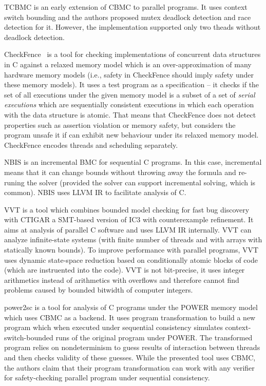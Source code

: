 TCBMC  is an early extension of CBMC to parallel programs.
It uses context switch bounding and the authors proposed mutex deadlock detection and race detection for it.
However, the implementation supported only two theads without deadlock detection.

CheckFence~ is a tool for checking implementations of concurrent data structures in C against a relaxed memory model which is an over-approximation of many hardware memory models (i.e., safety in CheckFence should imply safety under these memory models).
It uses a test program as a specification -- it checks if the set of all executions under the given memory model is a subset of a set of \emph{serial executions} which are sequentially consistent executions in which each operation with the data structure is atomic.
That means that CheckFence does not detect properties such as assertion violation or memory safety, but considers the program unsafe it if can exhibit new behaviour under its relaxed memory model.
CheckFence encodes threads and scheduling separately.

NBIS  is an incremental BMC for sequential C programs.
In this case, incremental means that it can change bounds without throwing away the formula and re-runing the solver (provided the solver can support incremental solving, which is common).
NBIS uses LLVM IR to facilitate analysis of C.

VVT  is a tool which combines bounded model checking for fast bug discovery with CTIGAR a SMT-based version of IC3 with counterexample refinement.
It aims at analysis of parallel C software and uses LLVM IR internally.
VVT can analyze infinite-state systems (with finite number of threads and with arrays with statically known bounds).
To improve performance with parallel programs, VVT uses dynamic state-space reduction based on conditionally atomic blocks of code (which are instruented into the code).
VVT is not bit-precise, it uses integer arithmetics instead of arithmetics with overflows and therefore cannot find problems caused by bounded bitwidth of computer integers.

power2sc  is a tool for analysis of C programs under the POWER memory model which uses CBMC as a backend.
It uses program transformation to build a new program which when executed under sequential consistency simulates context-switch-bounded runs of the original program under POWER.
The transformed program relies on nondeterminism to guess results of interaction between threads and then checks validity of these guesses.
While the presented tool uses CBMC, the authors claim that their program transformation can work with any verifier for safety-checking parallel program under sequential consistency.


